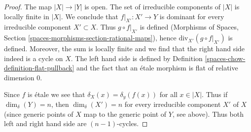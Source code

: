 \begin{proof}
The map $|X| \to |Y|$ is open. The set of irreducible components of $|X|$
is locally finite in $|X|$. We conclude that $f|_{X'} : X' \to Y$
is dominant for every irreducible component $X' \subset X$.
Thus $g \circ f|_{X'}$ is defined (Morphisms of Spaces, Section
\ref{spaces-morphisms-section-rational-maps}), hence
$\text{div}_{X'}(g \circ f|_{X'})$ is defined. Moreover, the
sum is locally finite and we find that the right hand side indeed
is a cycle on $X$. The left hand side is defined by
Definition \ref{spaces-chow-definition-flat-pullback}
and the fact that an \'etale morphism is flat of relative dimension $0$.

\medskip\noindent
Since $f$ is \'etale we see that $\delta_X(x) = \delta_y(f(x))$
for all $x \in |X|$. Thus if $\dim_\delta(Y) = n$, then $\dim_\delta(X') = n$
for every irreducible component $X'$ of $X$ (since generic points of $X$
map to the generic point of $Y$, see above). Thus both left
and right hand side are $(n - 1)$-cycles.


\end{proof}
